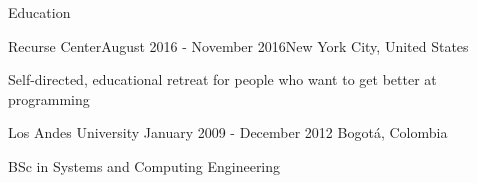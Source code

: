 \documentclass{resume} %
\def\uniandes{Los Andes University }
\begin{document}


\begin{rSection}{Education}

\begin{rSubsection}{Recurse Center}{August 2016 - November 2016}{New York City, United States}
\item Self-directed, educational retreat for people who want to get better at programming
\end{rSubsection}

\begin{rSubsection}{\uniandes}{January 2009 - December 2012} {Bogot\'a, Colombia}
\item BSc in Systems and Computing Engineering  
\end{rSubsection}

\end{rSection}

\end{document}
